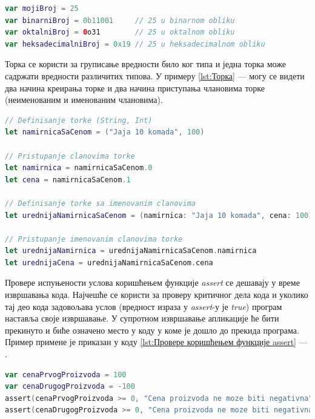 \documentclass[12pt,oneside]{memoir}
\begin{document}
\begin{lstlisting}[caption=\textit{{Целобројне променљиве}}, label={lst:Целобројне променљиве}, language=Swift, frame=single]
var mojiBroj = 25 
var binarniBroj = 0b11001     // 25 u binarnom obliku
var oktalniBroj = 0o31        // 25 u oktalnom obliku
var heksadecimalniBroj = 0x19 // 25 u heksadecimalnom obliku
\end{lstlisting}

\indent Торка се користи за груписање вредности било ког типа и једна торка може садржати вредности различитих типова. У примеру \ref{lst:Торка} ---  могу се видети два начина креирања торке и два начина приступања члановима торке (неименованим и именованим члановима).

\begin{lstlisting}[caption=\textit{{Торка}}, label={lst:Торка}, language=Swift, frame=single]
// Definisanje torke (String, Int)
let namirnicaSaCenom = ("Jaja 10 komada", 100)

// Pristupanje clanovima torke
let namirnica = namirnicaSaCenom.0
let cena = namirnicaSaCenom.1

// Definisanje torke sa imenovanim clanovima
let urednijaNamirnicaSaCenom = (namirnica: "Jaja 10 komada", cena: 100)

// Pristupanje imenovanim clanovima torke
let urednijaNamirnica = urednijaNamirnicaSaCenom.namirnica
let urednijaCena = urednijaNamirnicaSaCenom.cena
\end{lstlisting}

\indent Провере испуњености услова коришћењем функције \textit{assert} се дешавају у време извршавања кода. Најчешће се користи за проверу критичног дела кода и уколико тај део кода задовољава услов (вредност израза у \textit{assert}-у је \textit{true}) програм наставља своје извршавање. У супротном извршавање апликације ће бити прекинуто и биће означено место у коду у коме је дошло до прекида програма. Пример примене је приказан у коду \ref{lst:Провере коришћењем функције assert} --- .

\begin{lstlisting}[caption=\textit{{Провере коришћењем функције assert}}, label={lst:Провере коришћењем функције assert}, language=Swift, frame=single]
var cenaPrvogProizvoda = 100
var cenaDrugogProizvoda = -100
assert(cenaPrvogProizvoda >= 0, "Cena proizvoda ne moze biti negativna") //true
assert(cenaDrugogProizvoda >= 0, "Cena proizvoda ne moze biti negativna") //false
\end{lstlisting}
\end{document}
